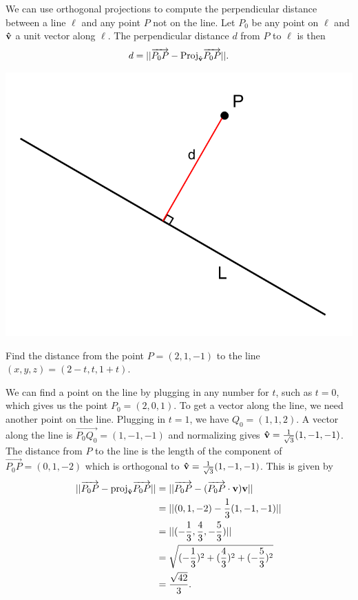 \documentclass[12pt,letterpaper,reqno]{article}
\numberwithin{equation}{section}
\begin{document}
\begin{example}
We can use orthogonal projections to compute the perpendicular distance between a line $\ell$ and any point $P$ not on the line. Let $P_0$ be any point on $\ell$ and ${\bf \hat{v}}$ a unit vector along $\ell$. The perpendicular distance $d$ from $P$ to $\ell$ is then
\begin{align*}
	d=||\overrightarrow{P_0P}-\text{Proj}_{{\bf \hat{v}}}\overrightarrow{P_0P}||.
\end{align*}	
\end{example}

\begin{center}
	\includegraphics[scale=0.3]{figures_mvc/distance_between_line_and_point}
\end{center}

\begin{exercise}
Find the distance from the point $P=(2,1,-1)$ to the line $(x,y,z)=(2-t,t,1+t)$.	
\end{exercise}

{\color{red} 
We can find a point on the line by plugging in any number for $t$, such as $t=0$, which gives us the point $P_0=(2,0,1)$. To get a vector along the line, we need another point on the line. Plugging in $t=1$, we have $Q_0=(1,1,2)$. A vector along the line is $\overrightarrow{P_0Q_0}=(1,-1,-1)$ and normalizing gives ${\bf \hat{v}}=\frac{1}{\sqrt{3}}(1,-1,-1)$. The distance from $P$ to the line is the length of the component of $\overrightarrow{P_0P}=(0,1,-2)$ which is orthogonal to ${\bf \hat{v}}=\frac{1}{\sqrt{3}}(1,-1,-1)$. This is given by
\begin{align*}
	||\overrightarrow{P_0P}-\text{proj}_{\bf \hat{v}}\overrightarrow{P_0P}||&=||\overrightarrow{P_0P}-(\overrightarrow{P_0P} \cdot {\bf v}){\bf v}|| \\
	&=||(0,1,-2)-\frac{1}{3}(1,-1,-1)|| \\
	&=||(-\frac{1}{3},\frac{4}{3}, -\frac{5}{3})|| \\
	&=\sqrt{(-\frac{1}{3})^2+(\frac{4}{3})^2+(-\frac{5}{3})^2} \\
	&=\frac{\sqrt{42}}{3}.
\end{align*}}
\end{document}
